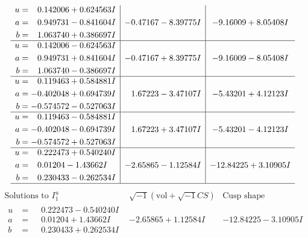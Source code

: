\documentclass[1p]{elsarticle_modified}
\theoremstyle{definition}
\newcommand{\I}{\sqrt{-1}}
\begin{document}
$$\begin{array}{c|c|c}
\begin{aligned}
u &= \phantom{-}0.142006 + 0.624563 I \\
a &= \phantom{-}0.949731 - 0.841604 I \\
b &= \phantom{-}1.063740 + 0.386697 I\end{aligned}
 & -0.47167 - 8.39775 I & -9.16009 + 8.05408 I \\ \hline\begin{aligned}
u &= \phantom{-}0.142006 - 0.624563 I \\
a &= \phantom{-}0.949731 + 0.841604 I \\
b &= \phantom{-}1.063740 - 0.386697 I\end{aligned}
 & -0.47167 + 8.39775 I & -9.16009 - 8.05408 I \\ \hline\begin{aligned}
u &= \phantom{-}0.119463 + 0.584881 I \\
a &= -0.402048 + 0.694739 I \\
b &= -0.574572 - 0.527063 I\end{aligned}
 & \phantom{-}1.67223 - 3.47107 I & -5.43201 + 4.12123 I \\ \hline\begin{aligned}
u &= \phantom{-}0.119463 - 0.584881 I \\
a &= -0.402048 - 0.694739 I \\
b &= -0.574572 + 0.527063 I\end{aligned}
 & \phantom{-}1.67223 + 3.47107 I & -5.43201 - 4.12123 I \\ \hline\begin{aligned}
u &= \phantom{-}0.222473 + 0.540240 I \\
a &= \phantom{-}0.01204 - 1.43662 I \\
b &= \phantom{-}0.230433 - 0.262534 I\end{aligned}
 & -2.65865 - 1.12584 I & -12.84225 + 3.10905 I\\
 \hline 
 \end{array}$$\newpage$$\begin{array}{c|c|c}  
\text{Solutions to }I^u_{1}& \I (\text{vol} + \sqrt{-1}CS) & \text{Cusp shape}\\
 \hline 
\begin{aligned}
u &= \phantom{-}0.222473 - 0.540240 I \\
a &= \phantom{-}0.01204 + 1.43662 I \\
b &= \phantom{-}0.230433 + 0.262534 I\end{aligned}
 & -2.65865 + 1.12584 I & -12.84225 - 3.10905 I \\ \hline\begin{aligned}

\end{aligned}
\end{array}$$
\end{document}
